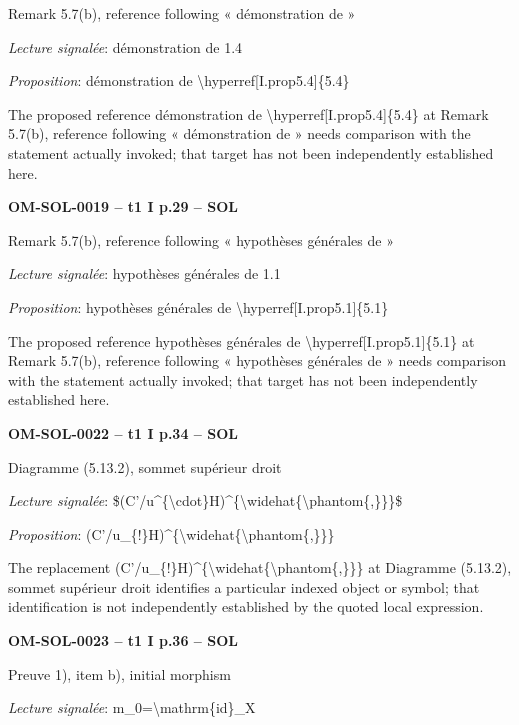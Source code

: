 Remark 5.7(b), reference following « démonstration de »\par
\emph{Lecture signalée}: démonstration de 1.4\par
\emph{Proposition}: démonstration de \textbackslash{}hyperref[I.prop5.4]\{5.4\}\par
The proposed reference démonstration de \textbackslash{}hyperref[I.prop5.4]\{5.4\} at Remark 5.7(b), reference following « démonstration de » needs comparison with the statement actually invoked; that target has not been independently established here.\par
\par\noindent\textbf{OM-SOL-0019 -- t1 I p.29 -- SOL}\par
Remark 5.7(b), reference following « hypothèses générales de »\par
\emph{Lecture signalée}: hypothèses générales de 1.1\par
\emph{Proposition}: hypothèses générales de \textbackslash{}hyperref[I.prop5.1]\{5.1\}\par
The proposed reference hypothèses générales de \textbackslash{}hyperref[I.prop5.1]\{5.1\} at Remark 5.7(b), reference following « hypothèses générales de » needs comparison with the statement actually invoked; that target has not been independently established here.\par
\par\noindent\textbf{OM-SOL-0022 -- t1 I p.34 -- SOL}\par
Diagramme (5.13.2), sommet supérieur droit\par
\emph{Lecture signalée}: \$(C'/u\textasciicircum{}\{\textbackslash{}cdot\}H)\textasciicircum{}\{\textbackslash{}widehat\{\textbackslash{}phantom\{,\}\}\}\$\par
\emph{Proposition}: (C'/u\_\{!\}H)\textasciicircum{}\{\textbackslash{}widehat\{\textbackslash{}phantom\{,\}\}\}\par
The replacement (C'/u\_\{!\}H)\textasciicircum{}\{\textbackslash{}widehat\{\textbackslash{}phantom\{,\}\}\} at Diagramme (5.13.2), sommet supérieur droit identifies a particular indexed object or symbol; that identification is not independently established by the quoted local expression.\par
\par\noindent\textbf{OM-SOL-0023 -- t1 I p.36 -- SOL}\par
Preuve 1), item b), initial morphism\par
\emph{Lecture signalée}: m\_0=\allowbreak \textbackslash{}mathrm\{id\}\_X\par
